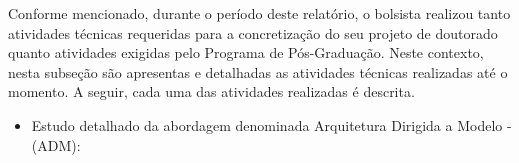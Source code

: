 
Conforme mencionado, durante o período deste relatório, o bolsista realizou tanto atividades técnicas requeridas para a concretização do seu projeto de doutorado quanto atividades exigidas pelo Programa de Pós-Graduação. Neste contexto, nesta subseção são apresentas e detalhadas as atividades técnicas realizadas até o momento. A seguir, cada uma das atividades realizadas é descrita.

\begin{itemize}

\item Estudo detalhado da abordagem denominada Arquitetura Dirigida a Modelo - (ADM): 

\end{itemize}
